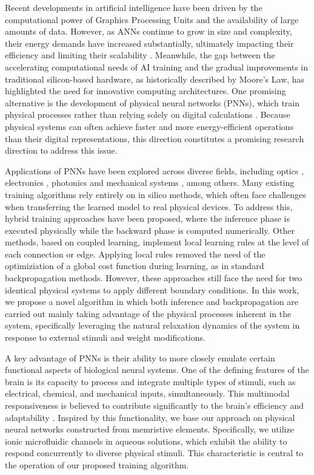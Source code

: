 \documentclass[reprint,superscriptaddress,prb,showkeys]{revtex4-2}
\begin{document}
Recent developments in artificial intelligence have been driven by the computational power of Graphics Processing Units and the availability of large amounts of data. However, as ANNs continue to grow in size and complexity, their energy demands have increased substantially, ultimately impacting their efficiency and limiting their scalability \cite{energy_cost_ml1, energy_cost_ml2}. Meanwhile, the gap between the accelerating computational needs of AI training and the gradual improvements in traditional silicon-based hardware, as historically described by Moore’s Law, has highlighted the need for innovative computing architectures. One promising alternative is the development of physical neural networks (PNNs), which train physical processes rather than relying solely on digital calculations \cite{trainingphysicalneuralnetworks,backporp_pnn}. Because physical systems can often achieve faster and more energy-efficient operations than their digital representations, this direction constitutes a promising research direction to address this issue.

Applications of PNNs have been explored across diverse fields, including optics \cite{optics1}, electronics \cite{electronics1}, photonics \cite{acoustic1} and mechanical systems \cite{mechanics1}, among others. Many existing training algorithms rely entirely on in silico methods, which often face challenges when transferring the learned model to real physical devices. To address this, hybrid training approaches have been proposed, where the inference phase is executed physically while the backward phase is computed numerically\cite{backporp_pnn}. Other methods, based on coupled learning\cite{supervised_learning}, implement local learning rules at the level of each connection or edge\cite{demonstr_coupled_learning}. Applying local rules removed the need of the optimiziation of a global cost function during learning, as in standard backpropagation methods. However, these approaches still face the need for two identical physical systems to apply different boundary conditions. In this work, we propose a novel algorithm in which both inference and backpropagation are carried out mainly taking advantage of the physical processes inherent in the system, specifically leveraging the natural relaxation dynamics of the system in response to external stimuli and weight modifications.

A key advantage of PNNs is their ability to more closely emulate certain functional aspects of biological neural systems. One of the defining features of the brain is its capacity to process and integrate multiple types of stimuli, such as electrical, chemical, and mechanical inputs, simultaneously. This multimodal responsiveness is believed to contribute significantly to the brain’s efficiency and adaptability \cite{}. Inspired by this functionality, we base our approach on physical neural networks constructed from memristive elements. Specifically, we utilize ionic microfluidic channels in aqueous solutions\cite{Rene_IonicNeuromorphic}, which exhibit the ability to respond concurrently to diverse physical stimuli. This characteristic is central to the operation of our proposed training algorithm.
\end{document}
